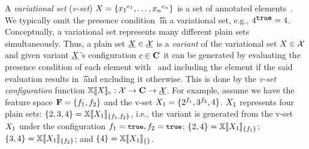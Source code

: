 A \emph{variational set} (\emph{v-set}) $\vset = \setDef {\annot [\dimMeta_1] {\elem_1},\ldots, \annot [\dimMeta_n] {\elem_n}}$ 
is a set of annotated elements~\cite{EWC13fosd,Walk14onward,ATW17dbpl}.
We typically omit the presence condition \t\ in a variational set,
e.g., $\annot [\t] 4 = 4$.
%
Conceptually, a variational set represents many different plain sets simultaneously.
Thus, a plain set $\pset \in \psetSet$  is a \emph{variant} of the variational set $\vset \in \vsetSet$ 
and given variant $\pset$'s configuration $\config \in \confSet$
it can be generated by evaluating the presence condition of each element with \config\
and including the element if the said evaluation results in \t\ and excluding it otherwise.
This is done by the \emph{v-set configuration} function
\ensuremath{\osetSem \vset : \vsetSet \to \confSet \to \psetSet}. 
For example, 
assume we have the feature space $\fSet = \setDef {\A, \B}$ 
and the v-set $\vset_1 = \setDef {\annot [\A] 2, \annot [\B] 3, 4}$.
$\vset_1$ represents four plain sets:
\ensuremath{  = \osetSem [\setDef {\A, \B}] {\vset_1}}, i.e., the variant 
 \setDef {2,3,4} is generated from the v-set $\vset_1$ under the configuration \ensuremath{\A = \t, \B = \t};
\ensuremath{ \setDef {2,4} = \osetSem [\setDef {\A}] {\vset_1}};
\ensuremath{ \setDef {3,4} = \osetSem [\setDef {\B}] {\vset_1}};
and \ensuremath{ \setDef {4} = \osetSem [\setDef {}] {\vset_1}}.
